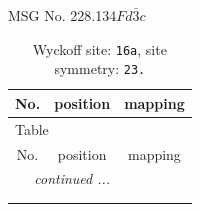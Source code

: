 \documentclass[fleqn,8pt]{jsarticle}
\begin{document}
\setcounter{MaxMatrixCols}{32}

\renewcommand{\tablename}{Table~}
\renewcommand{\figurename}{Figure~}
\begin{center}
\LARGE
MSG No. 228.134\quad$Fd\bar{3}c$
\end{center}
\renewcommand{\arraystretch}{1.2}
\begin{longtable}{ccc}
\caption{Wyckoff site: {\tt 16a}, site symmetry: {\tt 23.}}
 \\
 \hline \hline
No. & position & mapping \\ \hline \endfirsthead

\multicolumn{2}{l}{\tablename\ \thetable{}} \\
 \hline \hline
No. & position & mapping \\ \hline \endhead

 \hline \hline
\multicolumn{2}{r}{\footnotesize\it continued ...} \\ \endfoot

 \hline \hline
\multicolumn{2}{r}{} \\ \endlastfoot


\end{longtable}
\end{document}
